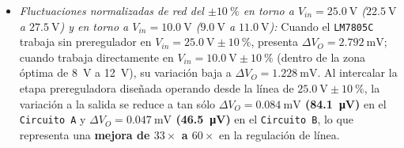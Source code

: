 \begin{enumerate}
\begin{itemize}
        \item \emph{Fluctuaciones normalizadas de red del $\pm \SI{10}{\percent}$ en torno a $V_{in} = \SI{25,0}{\volt}$ ($\SI{22,5}{\volt}$ a $\SI{27,5}{\volt}$) y en torno a $V_{in} = \SI{10,0}{\volt}$ ($\SI{9,0}{\volt}$ a $\SI{11,0}{\volt}$):} Cuando el \texttt{LM7805C} trabaja sin preregulador en $V_{in} = \SI{25,0}{\volt} \pm \SI{10}{\percent}$, presenta $\Delta V_O = \SI{2,792}{\milli\volt}$; cuando trabaja directamente en $V_{in} = \SI{10,0}{\volt} \pm \SI{10}{\percent}$ (dentro de la zona óptima de \SI{8}{\volt} a \SI{12}{\volt}), su variación baja a $\Delta V_O = \SI{1,228}{\milli\volt}$. Al intercalar la etapa prereguladora diseñada operando desde la línea de $\SI{25,0}{\volt} \pm \SI{10}{\percent}$, la variación a la salida se reduce a tan sólo \textbf{$\Delta V_O = \SI{0,084}{\milli\volt}$ (\SI{84,1}{\micro\volt})} en el \texttt{Circuito A} y \textbf{$\Delta V_O = \SI{0,047}{\milli\volt}$ (\SI{46,5}{\micro\volt})} en el \texttt{Circuito B}, lo que representa una \textbf{mejora de $33\times$ a $60\times$} en la regulación de línea.
    \end{itemize}
\end{enumerate}

